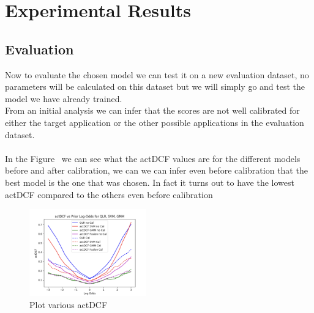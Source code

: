 \documentclass{article}
\begin{document}
\section{Experimental Results}
\subsection{Evaluation}
Now to evaluate the chosen model we can test it on a new evaluation dataset, no parameters will be calculated on this dataset but we will simply go and test the model we have already trained.\\
From an initial analysis we can infer that the scores are not well calibrated for either the target application or the other possible applications in the evaluation dataset.\\\\
In the Figure~ we can see what the actDCF values are for the different models before and after calibration, we can we can infer even before calibration that the best model is the one that was chosen. In fact it turns out to have the lowest actDCF compared to the others even before calibration
\begin{figure}[H]
    \centering
    \includegraphics[width=0.45\textwidth]{./img/PlotActDCF.png}
    \caption{Plot various actDCF}
    \label{fig:Act}
\end{figure} 
\end{document}
